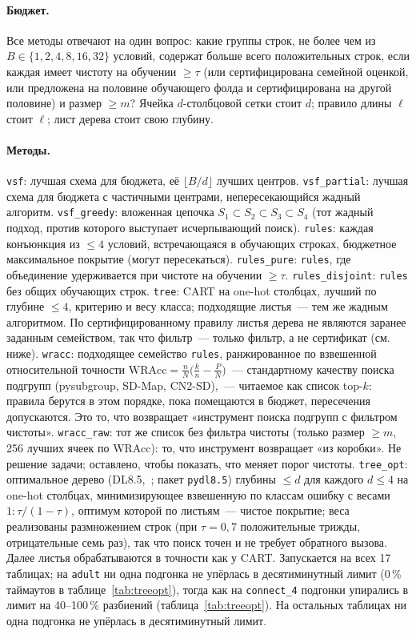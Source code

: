 \documentclass[11pt]{article}
\begin{document}
\paragraph{Бюджет.} Все методы отвечают на один вопрос: какие группы строк, не более чем из $B\in\{1,2,4,8,16,32\}$ условий, содержат больше всего положительных строк, если каждая имеет чистоту на обучении $\ge\tau$ (или сертифицирована семейной оценкой, или предложена на половине обучающего фолда и сертифицирована на другой половине) и размер $\ge m$? Ячейка $d$-столбцовой сетки стоит $d$; правило длины $\ell$ стоит $\ell$; лист дерева стоит свою глубину.

\paragraph{Методы.}
\texttt{vsf}: лучшая схема для бюджета, её $\lfloor B/d\rfloor$ лучших центров.
\texttt{vsf\_partial}: лучшая схема для бюджета с частичными центрами, непересекающийся жадный алгоритм.
\texttt{vsf\_greedy}: вложенная цепочка $S_1\subset S_2\subset S_3\subset S_4$ (тот жадный подход, против которого выступает исчерпывающий поиск).
\texttt{rules}: каждая конъюнкция из $\le 4$ условий, встречающаяся в обучающих строках, бюджетное максимальное покрытие (могут пересекаться).
\texttt{rules\_pure}: \texttt{rules}, где объединение удерживается при чистоте на обучении $\ge\tau$.
\texttt{rules\_disjoint}: \texttt{rules} без общих обучающих строк.
\texttt{tree}: CART на one-hot столбцах, лучший по глубине $\le 4$, критерию и весу класса; подходящие листья~--- тем же жадным алгоритмом. По сертифицированному правилу листья дерева не являются заранее заданным семейством, так что фильтр~--- только фильтр, а не сертификат (см. ниже).
\texttt{wracc}: подходящее семейство \texttt{rules}, ранжированное по взвешенной относительной точности $\mathrm{WRAcc}=\frac{n}{N}\big(\frac{k}{n}-\frac{P}{N}\big)$~--- стандартному качеству поиска подгрупп (pysubgroup, SD-Map, CN2-SD),~--- читаемое как список top-$k$: правила берутся в этом порядке, пока помещаются в бюджет, пересечения допускаются. Это то, что возвращает «инструмент поиска подгрупп с фильтром чистоты».
\texttt{wracc\_raw}: тот же список без фильтра чистоты (только размер $\ge m$, 256 лучших ячеек по WRAcc): то, что инструмент возвращает «из коробки». Не решение задачи; оставлено, чтобы показать, что меняет порог чистоты.
\texttt{tree\_opt}: оптимальное дерево (DL8.5,~\citealp{aglin2020}; пакет \texttt{pydl8.5}) глубины $\le d$ для каждого $d\le4$ на one-hot столбцах, минимизирующее взвешенную по классам ошибку с весами $1:\tau/(1-\tau)$, оптимум которой по листьям~--- чистое покрытие; веса реализованы размножением строк (при $\tau=0{,}7$ положительные трижды, отрицательные семь раз), так что поиск точен и не требует обратного вызова. Далее листья обрабатываются в точности как у CART. Запускается на всех 17 таблицах; на \texttt{adult} ни одна подгонка не упёрлась в десятиминутный лимит (0\,\% таймаутов в таблице~\ref{tab:treeopt}), тогда как на \texttt{connect\_4} подгонки упирались в лимит на 40--100\,\% разбиений (таблица~\ref{tab:treeopt}). На остальных таблицах ни одна подгонка не упёрлась в десятиминутный лимит.
\end{document}
